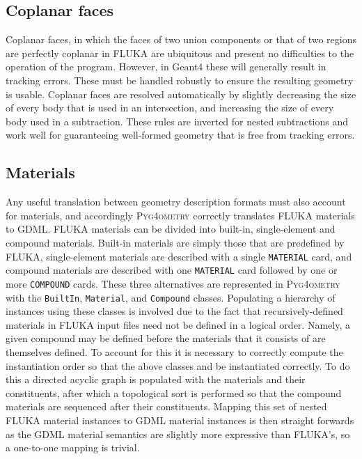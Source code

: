 \documentclass[final,5p,times,twocolumn]{elsarticle}
\newcommand{\pyinline}[1]{\lstinline[postbreak={}]{#1}}
\newcommand{\fluka}[1]{\texttt{\MakeUppercase{#1}}}
\newcommand{\PYGEOMETRY}{\textsc{Pyg4ometry}}
\begin{document}
\subsection{Coplanar faces}
Coplanar faces, in which the faces of two union components or that of
two regions are perfectly coplanar in FLUKA are ubiquitous and present
no difficulties to the operation of the program.  However, in Geant4
these will generally result in tracking errors.  These must be handled
robustly to ensure the resulting geometry is usable.  Coplanar faces
are resolved automatically by slightly decreasing the size of every
body that is used in an intersection, and increasing the size of every
body used in a subtraction.  These rules are inverted for nested
subtractions and work well for guaranteeing well-formed geometry that
is free from tracking errors.

\subsection{Materials}

Any useful translation between geometry description formats must also
account for materials, and accordingly \PYGEOMETRY{} correctly translates
FLUKA materials to GDML.  FLUKA materials can be divided into built-in,
single-element and compound materials.  Built-in materials are simply those
that are predefined by FLUKA, single-element materials are described with a
single \fluka{material} card, and compound materials are described with one
\fluka{material} card followed by one or more \fluka{compound} cards.
These three alternatives are represented in \PYGEOMETRY{} with the
\pyinline{BuiltIn}, \pyinline{Material}, and \pyinline{Compound} classes.
Populating a hierarchy of instances using these classes is involved due to
the fact that recursively-defined materials in FLUKA input files need not
be defined in a logical order.  Namely, a given compound may be
defined before the materials that it consists of are themselves defined.
To account for this it is necessary to correctly compute the instantiation
order so that the above classes and be instantiated correctly.  To do this
a directed acyclic graph is populated with the materials and their
constituents, after which a topological sort is performed so that the
compound materials are sequenced after their constituents.  Mapping this
set of nested FLUKA material instances to GDML material instances is then
straight forwards as the GDML material semantics are slightly more
expressive than FLUKA's, so a one-to-one mapping is trivial.
\end{document}
